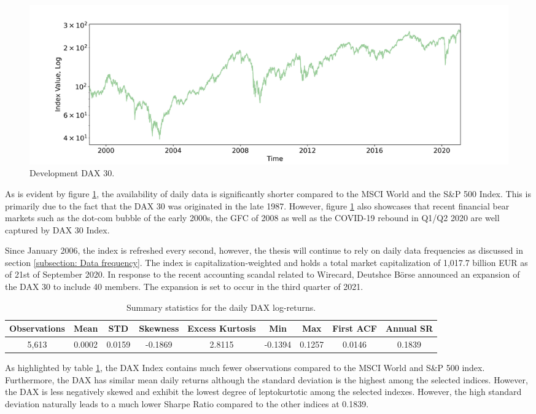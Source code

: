 \begin{figure}[H] 
    \centering
    \includegraphics[width=1\textwidth]{analysis/data_description/images/DAX_index.png}
    \caption{Development DAX 30.}
    \label{fig: DAX_index}
\end{figure}

As is evident by figure \ref{fig: DAX_index}, the availability of daily data is significantly shorter compared to the MSCI World and the S\&P 500 Index. This is primarily due to the fact that the DAX 30 was originated in the late 1987. However, figure \ref{fig: DAX_index} also showcases that recent financial bear markets such as the dot-com bubble of the early 2000s, the GFC of 2008 as well as the COVID-19 rebound in Q1/Q2 2020 are well captured by DAX 30 Index. 

Since January 2006, the index is refreshed every second, however, the thesis will continue to rely on daily data frequencies as discussed in section \ref{subsection: Data frequency}. The index is capitalization-weighted and holds a total market capitalization of 1,017.7 billion EUR as of 21st of September 2020. In response to the recent accounting scandal related to Wirecard, Deutshce Börse announced an expansion of the DAX 30 to include 40 members. The expansion is set to occur in the third quarter of 2021.

\begin{table}[H]
\caption{Summary statistics for the daily DAX log-returns.}
\centering
\begin{tabular}{c c c c c c c c c} 
\hline\hline
Observations & Mean & STD & Skewness & Excess Kurtosis & Min & Max & First ACF & Annual SR \\
\hline
5,613 & 0.0002 & 0.0159 & -0.1869 & 2.8115 & -0.1394 & 0.1257 & 0.0146 & 0.1839 \\
\hline
\end{tabular}
\label{tab:summary_stats_DAX}
\end{table}

As highlighted by table \ref{tab:summary_stats_DAX}, the DAX Index contains much fewer observations compared to the MSCI World and S\&P 500 index. Furthermore, the DAX has similar mean daily returns although the standard deviation is the highest among the selected indices. However, the DAX is less negatively skewed and exhibit the lowest degree of leptokurtotic among the selected indexes. However, the high standard deviation naturally leads to a much lower Sharpe Ratio compared to the other indices at 0.1839.

